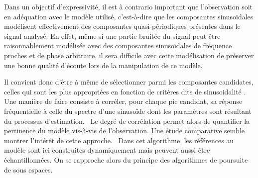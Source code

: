 


Dans un objectif d'expressivité, il est à contrario important que l'observation  soit en adéquation avec le modèle utilisé, c'est-à-dire que les composantes sinusoïdales modélisent effectivement des composantes quasi-périodiques présentes dans le signal analysé. En effet, même si une partie bruitée du signal peut être raisonnablement modélisée avec des composantes sinusoïdales de fréquence proches et de phase arbitraire, il sera difficile avec cette modélisation de préserver une bonne qualité d'écoute lors de la manipulation de ce modèle.

Il convient donc d'être à même de sélectionner parmi les composantes candidates, celles qui sont les plus appropriées en fonction de critères dits de \og sinusoidalité \fg. Une manière de faire consiste à corréler, pour chaque pic candidat, sa réponse fréquentielle à celle du spectre d'une sinusoïde dont les paramètres sont résultant du processus d'estimation.~\cite{peak-selection} Le degré de corrélation permet alors de quantifier la pertinence du modèle vis-à-vis de l'observation. Une étude comparative semble montrer l'intérêt de cette approche.~\cite{wells2010comparative} Dans cet algorithme, les références au modèle sont ici construites dynamiquement mais peuvent aussi être échantillonnées. On se rapproche alors du principe des algorithmes de poursuite de sous espaces.

